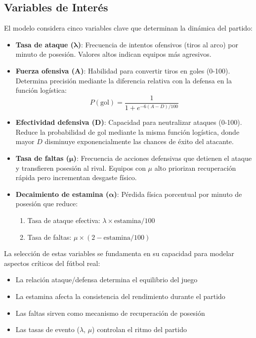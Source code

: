 \documentclass{article}
\begin{document}
\subsection{Variables de Interés}
El modelo considera cinco variables clave que determinan la dinámica del partido:

\begin{itemize}
    \item \textbf{Tasa de ataque ($\boldsymbol{\lambda}$)}: Frecuencia de intentos ofensivos (tiros al arco) por minuto de posesión. Valores altos indican equipos más agresivos.
    
    \item \textbf{Fuerza ofensiva ($\boldsymbol{A}$)}: Habilidad para convertir tiros en goles (0-100). Determina precisión mediante la diferencia relativa con la defensa en la función logística:
    \[
    P(\text{gol}) = \frac{1}{1 + e^{-6(A-D)/100}}
    \]
    
    \item \textbf{Efectividad defensiva ($\boldsymbol{D}$)}: Capacidad para neutralizar ataques (0-100). Reduce la probabilidad de gol mediante la misma función logística, donde mayor $D$ disminuye exponencialmente las chances de éxito del atacante.
    
    \item \textbf{Tasa de faltas ($\boldsymbol{\mu}$)}: Frecuencia de acciones defensivas que detienen el ataque y transfieren posesión al rival. Equipos con $\mu$ alto priorizan recuperación rápida pero incrementan desgaste físico.
    
    \item \textbf{Decaimiento de estamina ($\boldsymbol{\alpha}$)}: Pérdida física porcentual por minuto de posesión que reduce: 
    \begin{enumerate}
        \item Tasa de ataque efectiva: $\lambda \times \text{estamina}/100$
        \item Tasa de faltas: $\mu \times (2 - \text{estamina}/100)$
    \end{enumerate}
\end{itemize}

La selección de estas variables se fundamenta en su capacidad para modelar aspectos críticos del fútbol real:
\begin{itemize}
    \item La relación ataque/defensa determina el equilibrio del juego
    \item La estamina afecta la consistencia del rendimiento durante el partido
    \item Las faltas sirven como mecanismo de recuperación de posesión
    \item Las tasas de evento ($\lambda$, $\mu$) controlan el ritmo del partido
\end{itemize}
\end{document}
